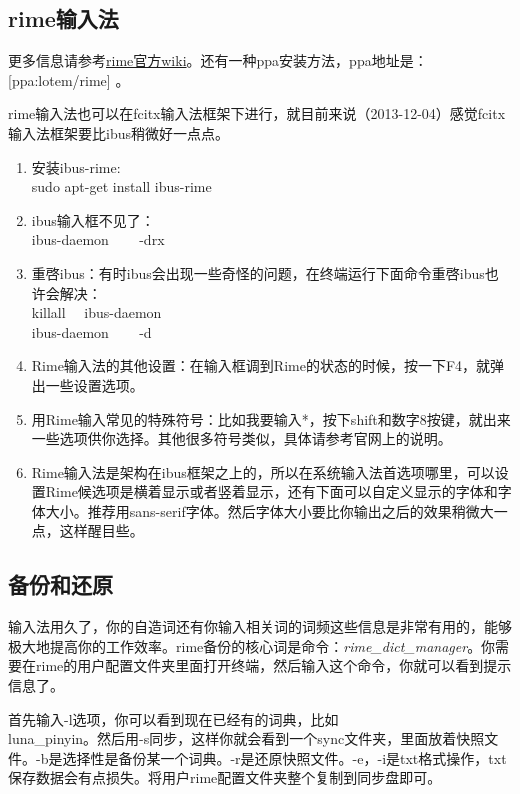 \documentclass[12pt,oneside]{book}
\begin{document}
\begin{common-format}
\section{rime输入法}
更多信息请参考\href{https://code.google.com/p/rimeime/w/list}{rime官方wiki}。还有一种ppa安装方法，ppa地址是：[ppa:lotem/rime] 。

rime输入法也可以在fcitx输入法框架下进行，就目前来说（2013-12-04）感觉fcitx输入法框架要比ibus稍微好一点点。

\begin{enumerate}
\item 安装ibus-rime:\\ sudo apt-get install ibus-rime
\item ibus输入框不见了：\\ ibus-daemon  ~~~  -drx
\item 重啓ibus：有时ibus会出现一些奇怪的问题，在终端运行下面命令重啓ibus也许会解决：\\ killall ~~ibus-daemon\\
             ibus-daemon ~~~ -d
\item Rime输入法的其他设置：在输入框调到Rime的状态的时候，按一下F4，就弹出一些设置选项。
\item 用Rime输入常见的特殊符号：比如我要输入*，按下shift和数字8按键，就出来一些选项供你选择。其他很多符号类似，具体请参考官网上的说明。
\item Rime输入法是架构在ibus框架之上的，所以在系统输入法首选项哪里，可以设置Rime候选项是横着显示或者竖着显示，还有下面可以自定义显示的字体和字体大小。推荐用sans-serif字体。然后字体大小要比你输出之后的效果稍微大一点，这样醒目些。
\end{enumerate}

\subsection{备份和还原}
输入法用久了，你的自造词还有你输入相关词的词频这些信息是非常有用的，能够极大地提高你的工作效率。rime备份的核心词是命令：\emph{rime\_{}dict\_{}manager}。你需要在rime的用户配置文件夹里面打开终端，然后输入这个命令，你就可以看到提示信息了。

首先输入-l选项，你可以看到现在已经有的词典，比如\\ luna\_{}pinyin。然后用-s同步，这样你就会看到一个sync文件夹，里面放着快照文件。-b是选择性是备份某一个词典。-r是还原快照文件。-e，-i是txt格式操作，txt保存数据会有点损失。将用户rime配置文件夹整个复制到同步盘即可。


\end{common-format}
\end{document}
